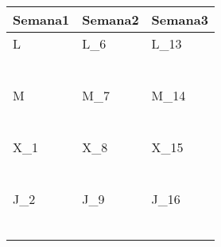 \clearpage
{}


	\renewcommand{\arraystretch}{1.24}\scriptsize
	\begin{longtabu} to \textwidth { X[l] X[l] X[l]}
		\centering \textbf{Semana1} &  \centering\textbf{Semana2}  &   \centering\textbf{Semana3}  \\
		\toprule
		L & L_{6} & L_{13} \\
		  & \makebox{$\square$}\dotfill & \makebox{$\square$}\dotfill \\
		  & \dotfill & \dotfill \\
		  & \makebox{$\square$}\dotfill & \makebox{$\square$}\dotfill \\
		  & \dotfill & \dotfill \\
		  & \makebox{$\square$}\dotfill & \makebox{$\square$}\dotfill \\
		  & \dotfill & \dotfill \\

		\hline

		M & M_{7} & M_{14} \\
		  & \makebox{$\square$}\dotfill & \makebox{$\square$}\dotfill \\
		  & \dotfill & \dotfill \\
		  & \makebox{$\square$}\dotfill & \makebox{$\square$}\dotfill \\
		  & \dotfill & \dotfill \\
		  & \makebox{$\square$}\dotfill & \makebox{$\square$}\dotfill \\
		  & \dotfill & \dotfill \\

		\hline

		X_{1} & X_{8} & X_{15} \\
		\makebox{$\square$}\dotfill & \makebox{$\square$}\dotfill & \makebox{$\square$}\dotfill \\
		\dotfill & \dotfill & \dotfill \\
		\makebox{$\square$}\dotfill & \makebox{$\square$}\dotfill & \makebox{$\square$}\dotfill \\
		\dotfill & \dotfill & \dotfill \\
		\makebox{$\square$}\dotfill & \makebox{$\square$}\dotfill & \makebox{$\square$}\dotfill \\
		\dotfill & \dotfill & \dotfill \\

		\hline

		J_{2} & J_{9} & J_{16} \\
		\makebox{$\square$}\dotfill & \makebox{$\square$}\dotfill & \makebox{$\square$}\dotfill \\
		\dotfill & \dotfill & \dotfill \\
		\makebox{$\square$}\dotfill & \makebox{$\square$}\dotfill & \makebox{$\square$}\dotfill \\
		\dotfill & \dotfill & \dotfill \\
		\makebox{$\square$}\dotfill & \makebox{$\square$}\dotfill & \makebox{$\square$}\dotfill \\
		\dotfill & \dotfill & \dotfill \\


\end{longtabu}
